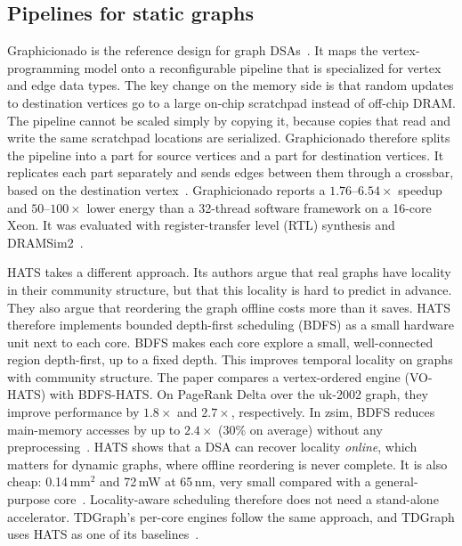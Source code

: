 \documentclass[journal,onecolumn]{IEEEtran}
\begin{document}
\subsection{Pipelines for static graphs}
Graphicionado is the reference design for graph DSAs~\cite{ham2016graphicionado}. It maps the vertex-programming model onto a reconfigurable pipeline that is specialized for vertex and edge data types. The key change on the memory side is that random updates to destination vertices go to a large on-chip scratchpad instead of off-chip DRAM. The pipeline cannot be scaled simply by copying it, because copies that read and write the same scratchpad locations are serialized. Graphicionado therefore splits the pipeline into a part for source vertices and a part for destination vertices. It replicates each part separately and sends edges between them through a crossbar, based on the destination vertex~\cite{ham2016graphicionado}. Graphicionado reports a $1.76$--$6.54\times$ speedup and $50$--$100\times$ lower energy than a 32-thread software framework on a 16-core Xeon. It was evaluated with register-transfer level (RTL) synthesis and DRAMSim2~\cite{ham2016graphicionado}.

HATS takes a different approach. Its authors argue that real graphs have locality in their community structure, but that this locality is hard to predict in advance. They also argue that reordering the graph offline costs more than it saves. HATS therefore implements bounded depth-first scheduling (BDFS) as a small hardware unit next to each core. BDFS makes each core explore a small, well-connected region depth-first, up to a fixed depth. This improves temporal locality on graphs with community structure. The paper compares a vertex-ordered engine (VO-HATS) with BDFS-HATS. On PageRank Delta over the uk-2002 graph, they improve performance by $1.8\times$ and $2.7\times$, respectively. In zsim, BDFS reduces main-memory accesses by up to $2.4\times$ (30\% on average) without any preprocessing~\cite{mukkara2018hats}. HATS shows that a DSA can recover locality \emph{online}, which matters for dynamic graphs, where offline reordering is never complete. It is also cheap: 0.14\,mm$^2$ and 72\,mW at 65\,nm, very small compared with a general-purpose core~\cite{mukkara2018hats}. Locality-aware scheduling therefore does not need a stand-alone accelerator. TDGraph's per-core engines follow the same approach, and TDGraph uses HATS as one of its baselines~\cite{zhao2022tdgraph}.
\end{document}
